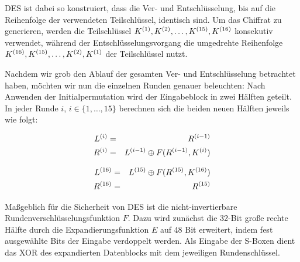 DES ist dabei so konstruiert, dass die Ver- und Entschlüsselung, bis auf die Reihenfolge der verwendeten Teilschlüssel, identisch sind. Um das Chiffrat zu generieren, werden die Teilschlüssel $K^{(1)},K^{(2)},\dots,K^{(15)},K^{(16)}$ konsekutiv verwendet, während der Entschlüsselungsvorgang die umgedrehte Reihenfolge $K^{(16)},K^{(15)},\dots,K^{(2)},K^{(1)}$ der Teilschlüssel nutzt.

Nachdem wir grob den Ablauf der gesamten Ver- und Entschlüsselung betrachtet haben, möchten wir nun die einzelnen Runden genauer beleuchten: Nach Anwenden der Initialpermutation wird der Eingabeblock in zwei Hälften geteilt. In jeder Runde $i$, $i \in \{1,\ldots,15\}$ berechnen sich die beiden neuen Hälften jeweils wie folgt:

\noindent
\begin{minipage}[h]{.45\textwidth}
	\begin{eqnarray*}
		L^{(i)}	& =	& R^{(i-1)} \\
		R^{(i)} 	& =	& L^{(i-1)} \oplus F(R^{(i-1)}, K^{(i)})
	\end{eqnarray*}
\end{minipage}\hfill
\begin{minipage}[h]{.45\textwidth}
	\begin{eqnarray*}
		L^{(16)} 	& =	& L^{(15)} \oplus F(R^{(15)}, K^{(16)}) \\
		R^{(16)}	& =	& R^{(15)}
	\end{eqnarray*}
\end{minipage}
\bigskip

Maßgeblich für die Sicherheit von DES ist die nicht-invertierbare Rundenverschlüsselungsfunktion $F$. Dazu wird zunächst die 32-Bit große rechte Hälfte durch die Expandierungsfunktion $E$ auf 48 Bit erweitert, indem fest ausgewählte Bits der Eingabe verdoppelt werden. Als Eingabe der S-Boxen dient das XOR des expandierten Datenblocks mit dem jeweiligen Rundenschlüssel.

